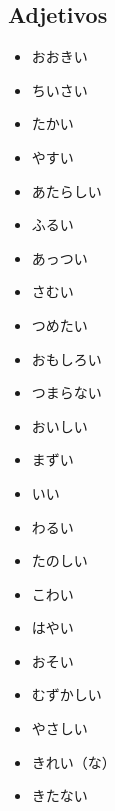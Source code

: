 \documentclass[a4paper, 12pt]{article}
\begin{document}
\subsection{Adjetivos}
\begin{CJK}{UTF8}{min}
	\begin{itemize}
		\item おおきい
		\item ちいさい\\
		
		\item たかい
		\item やすい\\
		
		\item あたらしい
		\item ふるい\\
		
		\item あっつい
		\item さむい
		\item つめたい\\
		
		\item おもしろい
		\item つまらない\\
		
		\item おいしい
		\item まずい\\
		
		\item いい
		\item わるい\\
		
		\item たのしい\\
		
		\item こわい\\
		
		\item はやい
		\item おそい\\
		
		\item むずかしい
		\item やさしい\\
		
		\item きれい（な）
		\item きたない\\
		

\end{itemize}
\end{CJK}
\end{document}
